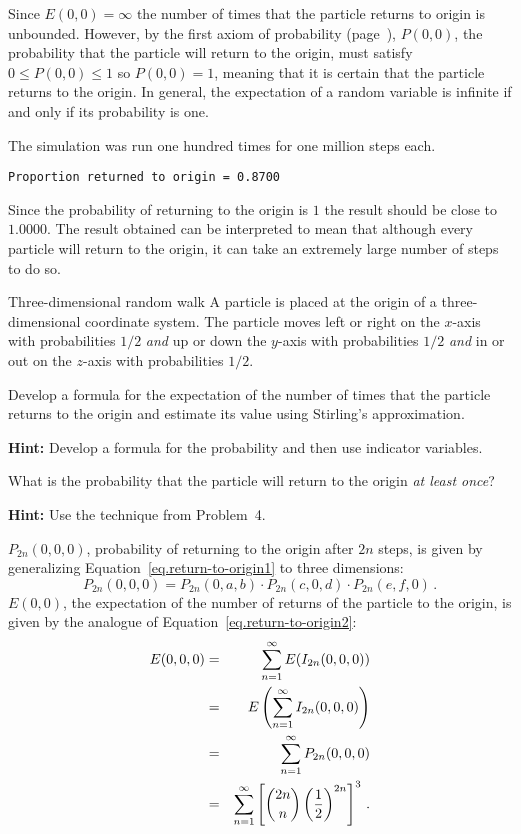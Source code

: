 Since $E(0,0)=\infty$ the number of times that the particle returns to origin is unbounded. However, by the first axiom of probability (page~\pageref{p.first-axiom}), $P(0,0)$, the probability that the particle will return to the origin, must satisfy $0\leq P(0,0) \leq 1$ so $P(0,0)=1$, meaning that it is certain that the particle returns to the origin. In general, the expectation of a random variable is infinite if and only if its probability is one.

\sml{}

The simulation was run one hundred times for one million steps each.
\begin{verbatim}
Proportion returned to origin = 0.8700
\end{verbatim}
Since the probability of returning to the origin is $1$ the result should be close to $1.0000$. The result obtained can be interpreted to mean that although every particle will return to the origin, it can take an extremely large number of steps to do so.


\begin{prob}{Three-dimensional random walk}
A particle is placed at the origin of a three-dimensional coordinate system. The particle moves left or right on the $x$-axis with probabilities $1/2$ \emph{and} up or down the $y$-axis with probabilities $1/2$ \emph{and} in or out on the $z$-axis with probabilities $1/2$.

 Develop a formula for the expectation of the number of times that the particle returns to the origin and estimate its value using Stirling's approximation.

\textbf{Hint:} Develop a formula for the probability and then use indicator variables.

 What is the probability that the particle will return to the origin \emph{at least once}?

\textbf{Hint:} Use the technique from Problem~4.
\end{prob}

\solution{}

 $P_{2n}(0,0,0)$, probability of returning to the origin after $2n$ steps, is given by generalizing Equation~\ref{eq.return-to-origin1} to three dimensions:
\begin{equation}\label{eq.rw-multiply}
P_{2n}(0,0,0) =
P_{2n}(0,a,b)\cdot P_{2n}(c,0,d)\cdot P_{2n}(e,f,0)\,.
\end{equation}
$E(0,0)$, the expectation of the number of returns of the particle to the origin, is given by the analogue of Equation~\ref{eq.return-to-origin2}:
\begin{eqnarray*}
E(0,0,0) &=&
\sum_{n=1}^{\infty}E(I_{2n}(0,0,0))\\
& =&E\left(\sum_{n=1}^{\infty}I_{2n}(0,0,0)\right) \\
&=&\sum_{n=1}^{\infty}P_{2n}(0,0,0)\\
& =&\sum_{n=1}^{\infty}\left[\displaystyle{2n \choose n}\left(\displaystyle\frac{1}{2}\right)^{2n}\right]^3\,.
\end{eqnarray*}

